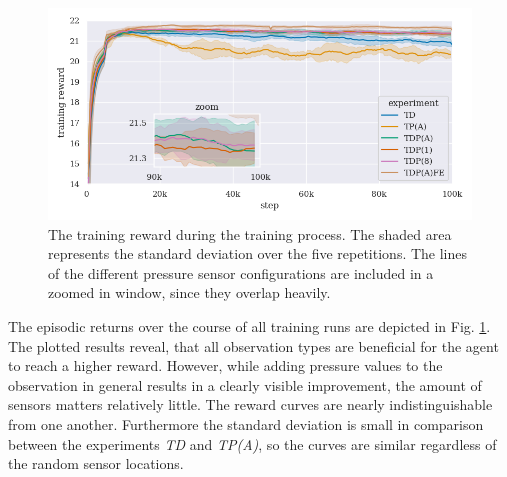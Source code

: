 \begin{figure}[htb]
    \centering
    \includegraphics[width=0.75\linewidth]{Figures/rewards_zoom.png}
    \caption{The training reward during the training process. The shaded area represents the standard deviation over the five repetitions. The lines of the different pressure sensor configurations are included in a zoomed in window, since they overlap heavily.}
    \label{fig:reward_training}
\end{figure}



The episodic returns over the course of all  training runs are depicted in Fig. \ref{fig:reward_training}.
The plotted results reveal, that all observation types are beneficial for the agent to reach a higher reward.
However, while adding pressure values to the observation in general results in a clearly visible improvement, the amount of sensors matters relatively little.
The reward curves are nearly indistinguishable from one another. Furthermore
the standard deviation is small in comparison between the experiments \textit{TD} and \textit{TP(A)}, so the curves are similar regardless of the random sensor locations.


